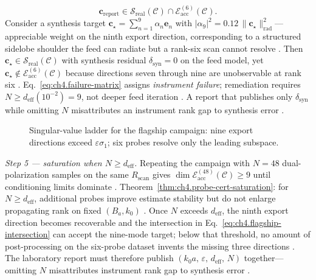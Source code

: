 \begin{equation}
\label{eq:ch4.flagship-intersection}
\mathbf{c}_{\mathrm{report}}
\in
\mathcal{S}_{\mathrm{real}}(\mathcal{C})
\cap
\mathcal{E}_{\mathrm{acc}}^{(6)}(\mathcal{C}).
\end{equation}
Consider a synthesis target $\mathbf{c}_{\star}=\sum_{n=1}^{9}\alpha_{n}\mathbf{e}_{n}$ with $|\alpha_{9}|^{2}=0.12\,\|\mathbf{c}_{\star}\|_{\mathrm{rad}}^{2}$---appreciable weight on the ninth export direction, corresponding to a structured sidelobe shoulder the feed can radiate but a rank-six scan cannot resolve . Then $\mathbf{c}_{\star}\in\mathcal{S}_{\mathrm{real}}(\mathcal{C})$ with synthesis residual $\delta_{\mathrm{syn}}=0$ on the feed model, yet $\mathbf{c}_{\star}\notin\mathcal{E}_{\mathrm{acc}}^{(6)}(\mathcal{C})$ because directions seven through nine are unobservable at rank six . Eq.~\eqref{eq:ch4.failure-matrix} assigns \emph{instrument failure}; remediation requires $N\ge d_{\mathrm{eff}}(10^{-2})=9$, not deeper feed iteration . A report that publishes only $\delta_{\mathrm{syn}}$ while omitting $N$ misattributes an instrument rank gap to synthesis error .
\begin{figure}[t]
\centering
{}
\caption{Singular-value ladder for the flagship campaign: nine export directions exceed $\varepsilon\sigma_{1}$; six probes resolve only the leading subspace.}
\label{fig:ch4.flagship-svd-ladder}
\end{figure}
\emph{Step 5 --- saturation when $N\ge d_{\mathrm{eff}}$.} Repeating the campaign with $N=48$ dual-polarization samples on the same $R_{\mathrm{scan}}$ gives $\dim\mathcal{E}_{\mathrm{acc}}^{(48)}(\mathcal{C})\ge 9$ until conditioning limits dominate . Theorem~\ref{thm:ch4.probe-cert-saturation}: for $N\ge d_{\mathrm{eff}}$, additional probes improve estimate stability but do not enlarge propagating rank on fixed $(B_{a},k_{0})$ . Once $N$ exceeds $d_{\mathrm{eff}}$, the ninth export direction becomes recoverable and the intersection in Eq.~\eqref{eq:ch4.flagship-intersection} can accept the nine-mode target; below that threshold, no amount of post-processing on the six-probe dataset invents the missing three directions . The laboratory report must therefore publish $(k_{0}a,\,\varepsilon,\,d_{\mathrm{eff}},\,N)$ together---omitting $N$ misattributes instrument rank gap to synthesis error .
